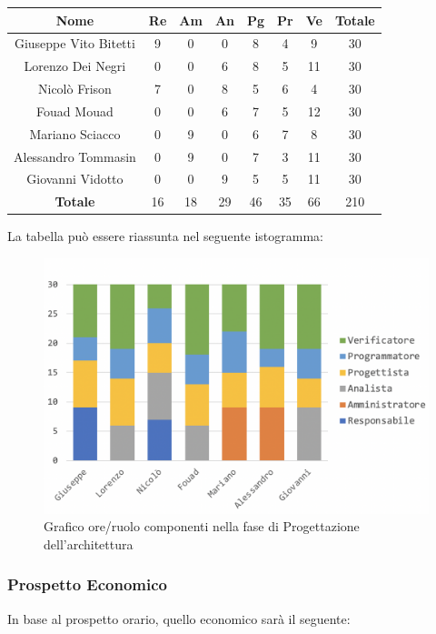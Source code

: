 		\begin{longtable}{|c|c|c|c|c|c|c|c}
			\hline
			\rowcolor{lighter-grayer}
			\textbf{Nome} & \textbf{Re} & \textbf{Am} & \textbf{An} & \textbf{Pg}  & \textbf{Pr}   & \textbf{Ve} & \textbf{Totale} \\
			\hline
			\endfirsthead
			
			\hline
			Giuseppe Vito Bitetti 		& 9 & 0 & 0 & 8 & 4 & 9 & 30\\
			\hline
			\hline
			Lorenzo Dei Negri			& 0 & 0 & 6 & 8 & 5 & 11 & 30\\
			\hline
			\hline
			Nicolò Frison				   & 7 & 0 & 8 & 5 & 6 & 4 & 30\\
			\hline
			\hline
			Fouad Mouad 				& 0 & 0 & 6 & 7 & 5 & 12 & 30\\
			\hline
			\hline
			Mariano Sciacco 			& 0 & 9 & 0 & 6 & 7 & 8 & 30\\
			\hline
			\hline
			Alessandro Tommasin    & 0 & 9 & 0 & 7 & 3 & 11 & 30\\
			\hline
			\hline
			Giovanni Vidotto 			& 0 & 0 & 9 & 5 & 5 & 11 & 30\\
			\hline 
			\textbf{Totale}			 & 16 &  18 & 29 & 46 & 35 & 66 & 210\\
			\hline
		\end{longtable}
		\pagebreak
		
		La tabella può essere riassunta nel seguente istogramma:
		\begin{figure}[H]
			\centering
			\includegraphics[width=0.8\linewidth]{./images/progArch1.png}
			\caption{Grafico ore/ruolo componenti nella fase di Progettazione dell'architettura}
			\label{fig:grafico suddivione ruoli fase Progettazione archittetura}
		\end{figure}
	
		\subsubsection{Prospetto Economico}
		In base al prospetto orario, quello economico sarà il seguente: 
		
